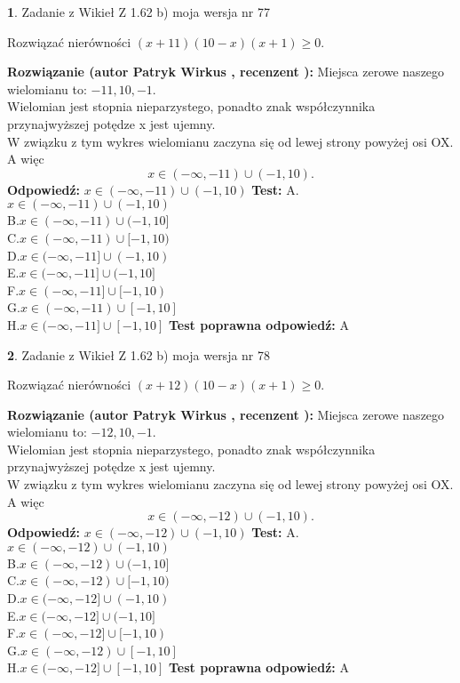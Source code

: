 \documentclass[12pt, a4paper]{article}
\theoremstyle{definition} %
\newtheorem{zad}{}
\newcommand{\zadStart}[1]{\begin{zad}#1\newline}
\newcommand{\zadStop}{\end{zad}}
\newcommand{\rozwStart}[2]{\noindent \textbf{Rozwiązanie (autor #1 , recenzent #2): }\newline}
\newcommand{\rozwStop}{\newline}
\newcommand{\odpStart}{\noindent \textbf{Odpowiedź:}\newline}
\newcommand{\odpStop}{\newline}
\newcommand{\testStart}{\noindent \textbf{Test:}\newline}
\newcommand{\testStop}{\newline}
\newcommand{\kluczStart}{\noindent \textbf{Test poprawna odpowiedź:}\newline}
\newcommand{\kluczStop}{\newline}
\begin{document}
\zadStart{Zadanie z Wikieł Z 1.62 b) moja wersja nr 77}

Rozwiązać nierówności $(x+11)(10-x)(x+1)\ge0$.
\zadStop
\rozwStart{Patryk Wirkus}{}
Miejsca zerowe naszego wielomianu to: $-11, 10, -1$.\\
Wielomian jest stopnia nieparzystego, ponadto znak współczynnika przy\linebreak najwyższej potędze x jest ujemny.\\ W związku z tym wykres wielomianu zaczyna się od lewej strony powyżej osi OX. A więc $$x \in (-\infty,-11) \cup (-1,10).$$
\rozwStop
\odpStart
$x \in (-\infty,-11) \cup (-1,10)$
\odpStop
\testStart
A.$x \in (-\infty,-11) \cup (-1,10)$\\
B.$x \in (-\infty,-11) \cup (-1,10]$\\
C.$x \in (-\infty,-11) \cup [-1,10)$\\
D.$x \in (-\infty,-11] \cup (-1,10)$\\
E.$x \in (-\infty,-11] \cup (-1,10]$\\
F.$x \in (-\infty,-11] \cup [-1,10)$\\
G.$x \in (-\infty,-11) \cup [-1,10]$\\
H.$x \in (-\infty,-11] \cup [-1,10]$
\testStop
\kluczStart
A
\kluczStop



\zadStart{Zadanie z Wikieł Z 1.62 b) moja wersja nr 78}

Rozwiązać nierówności $(x+12)(10-x)(x+1)\ge0$.
\zadStop
\rozwStart{Patryk Wirkus}{}
Miejsca zerowe naszego wielomianu to: $-12, 10, -1$.\\
Wielomian jest stopnia nieparzystego, ponadto znak współczynnika przy\linebreak najwyższej potędze x jest ujemny.\\ W związku z tym wykres wielomianu zaczyna się od lewej strony powyżej osi OX. A więc $$x \in (-\infty,-12) \cup (-1,10).$$
\rozwStop
\odpStart
$x \in (-\infty,-12) \cup (-1,10)$
\odpStop
\testStart
A.$x \in (-\infty,-12) \cup (-1,10)$\\
B.$x \in (-\infty,-12) \cup (-1,10]$\\
C.$x \in (-\infty,-12) \cup [-1,10)$\\
D.$x \in (-\infty,-12] \cup (-1,10)$\\
E.$x \in (-\infty,-12] \cup (-1,10]$\\
F.$x \in (-\infty,-12] \cup [-1,10)$\\
G.$x \in (-\infty,-12) \cup [-1,10]$\\
H.$x \in (-\infty,-12] \cup [-1,10]$
\testStop
\kluczStart
A
\kluczStop
\end{document}
